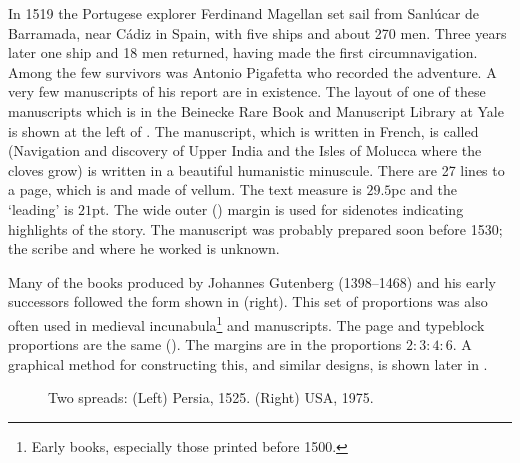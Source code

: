 \documentclass[10pt,a4paper,oneside,extrafontsizes]{memoir}%
\begin{document}
\begin{paracol}{2}
\switchEng
    In 1519 the Portugese explorer Ferdinand Magellan set sail from 
Sanl\'{u}car de Barramada, near C\'{a}diz in Spain, 
with five ships and about 270 men.
Three years later one ship and 18 men returned, having made the first
circumnavigation. Among the few survivors was Antonio Pigafetta who recorded
the adventure. 
A very few manuscripts of his report are in existence.
The layout of one of these manuscripts which is in the Beinecke Rare
Book and Manuscript Library at Yale is shown at the left of .
The manuscript, which is written in French, is called 
 (Navigation and discovery
of Upper India and the Isles of Molucca where the cloves grow) is written
in a beautiful humanistic minuscule. 
There are 27 lines to a page, which
is  and made of vellum. The text measure is $29.5$pc
and the `leading' is $21$pt. The wide outer (\foredge) margin is used 
for sidenotes
indicating highlights of the story. The manuscript was probably prepared 
soon before 1530; the scribe and where he worked is unknown.

    Many of the books produced by Johannes Gutenberg
(1398--1468) and his early successors followed the form shown in
 (right). This set of proportions was also often used in
medieval incunabula\footnote{Early books, especially 
those printed before 1500.}  and manuscripts. The page and typeblock 
proportions are the same (). The margins are in the 
proportions $2 : 3 : 4 : 6$.
A graphical method for constructing this, and similar designs, is 
shown later in .
\end{paracol}

\begin{figure}
\centering
\begin{minipage}[b]{\pwlayi}
\end{minipage}
\hfill
\begin{minipage}[b]{\pwlayi}
\end{minipage}
\caption[Two spreads: Persia, 1525 and USA, 1975]%
        {Two spreads: (Left) Persia, 1525.
         (Right) USA, 1975.} \label{fb:10}
\end{figure}
\end{document}
